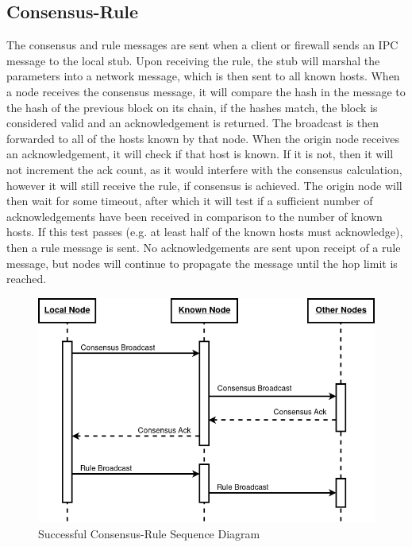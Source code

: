 \documentclass[a4paper, 11pt]{report}
\begin{document}
\subsection{Consensus-Rule}
The consensus and rule messages are sent when a client or firewall sends an \acrshort{IPC} message to the local \gls{stub}. Upon receiving the rule, the \gls{stub} will marshal the parameters into a network message, which is then sent to all known hosts. When a node receives the consensus message, it will compare the hash in the message to the hash of the previous block on its chain, if the hashes match, the block is considered valid and an acknowledgement is returned. The broadcast is then forwarded to all of the hosts known by that node. When the origin node receives an acknowledgement, it will check if that host is known. If it is not, then it will not increment the ack count, as it would interfere with the consensus calculation, however it will still receive the rule, if consensus is achieved. The origin node will then wait for some timeout, after which it will test if a sufficient number of acknowledgements have been received in comparison to the number of known hosts. If this test passes (e.g. at least half of the known hosts must acknowledge), then a rule message is sent. No acknowledgements are sent upon receipt of a rule message, but nodes will continue to propagate the message until the hop limit is reached.

\begin{figure}[H]
\centering
\includegraphics[width=\textwidth,keepaspectratio]{consensus_rule_seq}
\caption{Successful Consensus-Rule Sequence Diagram}
\label{fig:consruleseq}
\end{figure}
\end{document}
